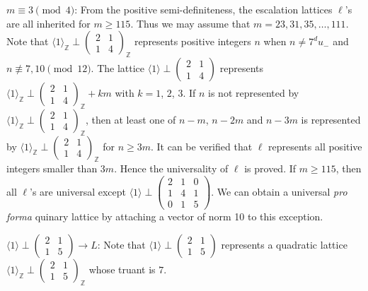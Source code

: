 \documentclass[a4paper,10pt,reqno]{amsart}
\begin{document}
{} $m \equiv 3 \pmod{4}$: From the positive semi-definiteness, the escalation
lattices $\ell$'s are all inherited for $m \ge 115$. Thus we may assume that $m = 23, 31, 35,
\dotsc, 111$. Note that ${\langle {1} \rangle}_{\mathbb{Z}} \perp {\begin{pmatrix}
  2 & 1 \\
  1 & 4
\end{pmatrix}}_{\mathbb{Z}}$ represents positive integers $n$ when
$n \ne 7^{d} u_{-}$ and $n {\not\equiv} 7,10 \pmod{12}$. The  lattice ${\langle {1} \rangle} \perp {\begin{pmatrix}
  2 & 1 \\
  1 & 4
\end{pmatrix}}$
represents ${\langle {1} \rangle}_{\mathbb{Z}} \perp {\begin{pmatrix}
  2 & 1 \\
  1 & 4
\end{pmatrix}}_{\mathbb{Z}} + km$ with $k=1$, $2$, $3$. If $n$ is not
represented by ${\langle {1} \rangle}_{\mathbb{Z}} \perp {\begin{pmatrix}
  2 & 1 \\
  1 & 4
\end{pmatrix}}_{\mathbb{Z}}$, then at least one of $n-m$, $n-2m$ and $n-3m$
is represented by ${\langle {1} \rangle}_{\mathbb{Z}} \perp {\begin{pmatrix}
  2 & 1 \\
  1 & 4
\end{pmatrix}}_{\mathbb{Z}}$ for $n \ge 3m$. It can be verified that
$\ell$ represents all positive integers smaller than $3m$. Hence the universality of $\ell$ is
proved. If $m \geq 115$, then all $\ell$'s are universal except ${\langle {1} \rangle} \perp
{\begin{pmatrix}
  {2} & {1} & {0} \\
  {1} & {4} & {1} \\
  {0} & {1} & {5}
\end{pmatrix}}$. We can obtain a universal \emph{pro forma} quinary lattice
by attaching a vector of norm 10 to this exception.

{} ${\langle {1} \rangle}\perp{\begin{pmatrix}
  2 & 1 \\
  1 & 5
\end{pmatrix}} \to L$: Note that ${\langle {1} \rangle}\perp{\begin{pmatrix}
  2 & 1 \\
  1 & 5
\end{pmatrix}}$ represents
a quadratic lattice ${\langle {1} \rangle}_{\mathbb{Z}}\perp{\begin{pmatrix}
  2 & 1 \\
  1 & 5
\end{pmatrix}}_{\mathbb{Z}}$ whose truant is $7$.
\end{document}
